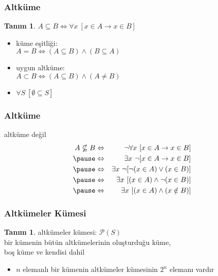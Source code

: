 \documentclass[dvipsnames]{beamer}
\theoremstyle{definition}
\newtheorem{tanim}[theorem]{Tanım}
\theoremstyle{example}
\theoremstyle{plain}
\begin{document}
\begin{frame}
  \frametitle{Altküme}

  \begin{tanim}
    $A \subseteq B \Leftrightarrow \forall x~[x \in A \rightarrow x \in B]$
  \end{tanim}

  \pause
  \begin{itemize}
    \item \alert{küme eşitliği}:\\
      $A = B \Leftrightarrow (A \subseteq B) \wedge (B \subseteq A)$

    \pause
    \item \alert{uygun altküme}:\\
      $A \subset B \Leftrightarrow (A \subseteq B) \wedge (A \neq B)$

    \pause
    \item $\forall S~[\emptyset \subseteq S]$
  \end{itemize}
\end{frame}

\begin{frame}
  \frametitle{Altküme}

  \begin{block}{altküme değil}
    \begin{eqnarray*}
      A \nsubseteq B & \Leftrightarrow
                     & \neg \forall x~[x \in A \rightarrow x \in B]\\\pause
                     & \Leftrightarrow
                     & \exists x~\neg [x \in A \rightarrow x \in B]\\\pause
                     & \Leftrightarrow
                     & \exists x~\neg [\neg (x \in A) \vee (x \in B)]\\\pause
                     & \Leftrightarrow
                     & \exists x~[(x \in A) \wedge \neg (x \in B)]\\\pause
                     & \Leftrightarrow
                     & \exists x~[(x \in A) \wedge (x \notin B)]
    \end{eqnarray*}
  \end{block}
\end{frame}

\begin{frame}
  \frametitle{Altkümeler Kümesi}

  \begin{tanim}
    \alert{altkümeler kümesi}: $\mathcal{P}(S)$\\
    bir kümenin bütün altkümelerinin oluşturduğu küme,\\
    boş küme ve kendisi dahil
  \end{tanim}

  \pause
  \begin{itemize}
    \item $n$ elemanlı bir kümenin altkümeler kümesinin $2^n$ elemanı vardır
  \end{itemize}
\end{frame}
\end{document}
